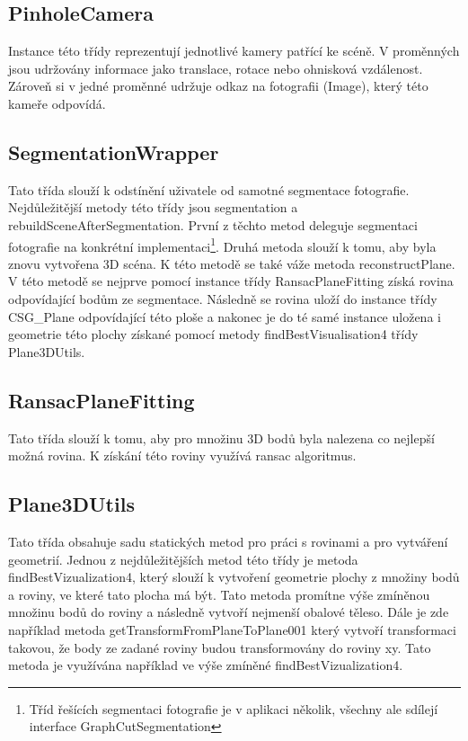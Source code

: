 \documentclass[11pt,twoside,a4paper]{book}
\begin{document}
\subsection{PinholeCamera}
Instance této třídy reprezentují jednotlivé kamery patřící ke scéně. V proměnných jsou udržovány informace jako translace, rotace nebo ohnisková vzdálenost. Zároveň si v jedné proměnné udržuje odkaz na fotografii (Image), který této kameře odpovídá. 

\subsection{SegmentationWrapper}
Tato třída slouží k odstínění uživatele od samotné segmentace fotografie. Nejdůležitější metody této třídy jsou segmentation a rebuildSceneAfterSegmentation. První z těchto metod deleguje segmentaci fotografie na konkrétní implementaci\footnote{Tříd řešících segmentaci fotografie je v aplikaci několik, všechny ale sdílejí interface GraphCutSegmentation}. Druhá metoda slouží k tomu, aby byla znovu vytvořena 3D scéna. K této metodě se také váže metoda reconstructPlane. V této metodě se nejprve pomocí instance třídy RansacPlaneFitting získá rovina odpovídající bodům ze segmentace. Následně se rovina uloží do instance třídy CSG\_Plane odpovídající této ploše a nakonec je do té samé instance uložena i geometrie této plochy získané pomocí metody findBestVisualisation4 třídy Plane3DUtils.

\subsection{RansacPlaneFitting}
Tato třída slouží k tomu, aby pro množinu 3D bodů byla nalezena co nejlepší možná rovina. K získání této roviny využívá ransac algoritmus.

\subsection{Plane3DUtils}
Tato třída obsahuje sadu statických metod pro práci s rovinami a pro vytváření geometrií. Jednou z nejdůležitějších metod této třídy je metoda findBestVizualization4, který slouží k vytvoření geometrie plochy z množiny bodů a roviny, ve které tato plocha má být. Tato metoda promítne výše zmíněnou množinu bodů do roviny a následně vytvoří nejmenší obalové těleso. Dále je zde například metoda getTransformFromPlaneToPlane001 který vytvoří transformaci takovou, že body ze zadané roviny budou transformovány do roviny xy. Tato metoda je využívána například ve výše zmíněné findBestVizualization4.
\end{document}
